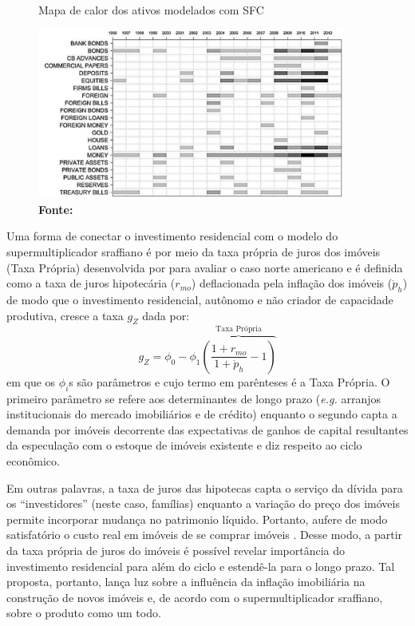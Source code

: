 \begin{figure}[htb]
	\centering
	\caption{Mapa de calor dos ativos modelados com SFC}
	\label{Heatmap}
	\includegraphics[width = 0.9\textwidth]{../../Escrita_Dissertacao/Da_Silveira_Dissertacao_Atual/Modelo/Caverzassi_Heatmap.png}
	\caption*{\textbf{Fonte:} \textcite[p.~4]{caverzasi_stock-flow_2013}}
\end{figure}


Uma forma de conectar o investimento residencial com o modelo do supermultiplicador sraffiano é por meio da taxa própria de juros dos imóveis (Taxa Própria) desenvolvida por \textcite{teixeira_crescimento_2015} para avaliar o caso norte americano e é definida como a taxa de juros hipotecária ($r_{mo}$) deflacionada pela inflação dos imóveis ({$\dot p_h$}) de modo que o investimento residencial, autônomo e não criador de capacidade produtiva, cresce a taxa $g_Z$ dada por:
\begin{equation}
g_Z = \phi_0 - \phi_1 \overbrace{\left(\frac{1+r_{mo}}{1+\dot p_h} - 1\right)}^{\text{Taxa Própria}}
\end{equation}
em que os $\phi_i$s são parâmetros e cujo termo em parênteses é a Taxa Própria. O primeiro parâmetro se refere aos determinantes de longo prazo (\textit{e.g.} arranjos institucionais do mercado imobiliários e de crédito) enquanto o segundo capta a demanda por imóveis decorrente das expectativas de ganhos de capital resultantes da especulação com o estoque de imóveis existente e diz respeito ao ciclo econômico.

Em outras palavras, a taxa de juros das hipotecas capta o serviço da dívida para os ``investidores'' (neste caso, famílias) enquanto a variação do preço dos imóveis permite incorporar mudança no patrimonio líquido. Portanto, aufere de modo satisfatório o custo real em imóveis de se comprar imóveis \cite[p.~53]{teixeira_crescimento_2015}. Desse modo, a partir da taxa própria de juros do imóveis é possível revelar importância do investimento residencial para além do ciclo e estendê-la para o longo prazo.  Tal proposta, portanto, lança luz sobre a influência da inflação imobiliária na construção de novos imóveis e, de acordo com o supermultiplicador sraffiano, sobre o produto como um todo. 

